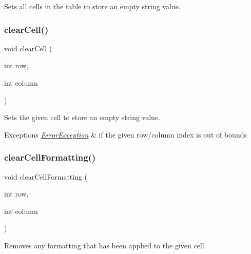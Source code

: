 Sets all cells in the table to store an empty string value. 

\mbox{\label{classGTable_ab7bffbf52806e438ac155886079d9bf6}} 
\subsubsection{\texorpdfstring{clear\+Cell()}{clearCell()}}
{\footnotesize\ttfamily void clear\+Cell (\begin{DoxyParamCaption}\item[{int}]{row,  }\item[{int}]{column }\end{DoxyParamCaption})\hspace{0.3cm}{\ttfamily [virtual]}}



Sets the given cell to store an empty string value. 


\begin{DoxyExceptions}{Exceptions}
{\em \mbox{\hyperlink{classErrorException}{Error\+Exception}}} & if the given row/column index is out of bounds \\
\hline
\end{DoxyExceptions}
\mbox{\label{classGTable_a5ba4fe558e9d315c123ecd9e896065ca}} 
\subsubsection{\texorpdfstring{clear\+Cell\+Formatting()}{clearCellFormatting()}}
{\footnotesize\ttfamily void clear\+Cell\+Formatting (\begin{DoxyParamCaption}\item[{int}]{row,  }\item[{int}]{column }\end{DoxyParamCaption})\hspace{0.3cm}{\ttfamily [virtual]}}



Removes any formatting that has been applied to the given cell. 

\mbox{\label{classGObservable_a80cfa040459ff53594adbd6a51ec8f43}} 
